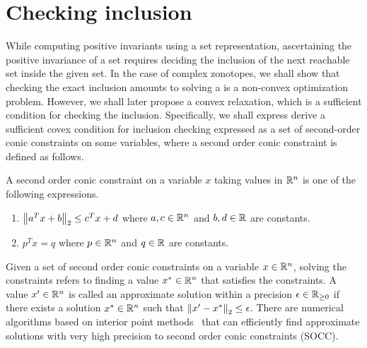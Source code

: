 \section{Checking inclusion}
While computing positive invariants using a set representation,
ascertaining the positive invariance of a set requires deciding the
inclusion of the next reachable set inside the given set.  In the case
of complex zonotopes, we shall show that checking the exact inclusion
amounts to solving a is a non-convex optimization problem.  However,
we shall later propose a convex relaxation, which is a sufficient
condition for checking the inclusion.  Specifically, we shall express
derive a sufficient covex condition for inclusion checking expressed
as a set of second-order conic constraints on some variables, where a
second order conic constraint is defined as follows.
%
\begin{definition}
A second order conic constraint on a variable $x$ taking values in
$\mathbb{R}^n$ is one of the following expressions.
\begin{enumerate}
\item  $\left\|a^Tx+b\right\|_{2}\leq c^Tx+d$ where $a,c\in\mathbb{R}^n$ and
$b,d\in\mathbb{R}$ are constants.
\item $p^Tx=q$ where $p\in\mathbb{R}^n$ and $q\in\mathbb{R}$ are constants.
\end{enumerate}
\end{definition}
%
Given a set of second order conic constraints on a variable
$x\in\mathbb{R}^n$, solving the constraints refers to finding a value
$x^*\in\mathbb{R}^n$ that satisfies the constraints.  A value
$x^\prime\in\mathbb{R}^n$ is called an approximate solution within a
precision $\epsilon\in\mathbb{R}_{\geq 0}$ if there exists a solution
$x^*\in\mathbb{R}^n$ such that $\left\|x^\prime-x^*\right\|_{2}\leq \epsilon$.  There
are numerical algorithms based on interior point methods~\cite{todo}
that can efficiently find approximate solutions with very high
precision to second order conic constraints (SOCC).

